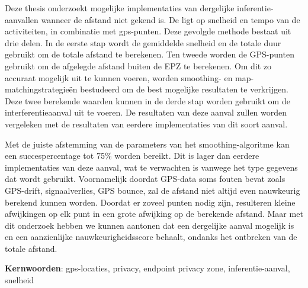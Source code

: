 Deze thesis onderzoekt mogelijke implementaties van dergelijke
inferentie-aanvallen wanneer de afstand niet gekend is. De ligt op snelheid en
tempo van de activiteiten, in combinatie met gps-punten. Deze gevolgde methode
bestaat uit drie delen. In de eerste stap wordt de gemiddelde snelheid en de
totale duur gebruikt om de totale afstand te berekenen. Ten tweede worden de
GPS-punten gebruikt om de afgelegde afstand buiten de EPZ te berekenen. Om dit
zo accuraat mogelijk uit te kunnen voeren, worden smoothing- en
map-matchingstrategieën bestudeerd om de best mogelijke resultaten te
verkrijgen. Deze twee berekende waarden kunnen in de derde stap worden gebruikt
om de interferentieaanval uit te voeren. De resultaten van deze aanval zullen
worden vergeleken met de resultaten van eerdere implementaties van dit soort
aanval.

Met de juiste afstemming van de parameters van het smoothing-algoritme kan een
succespercentage tot 75\% worden bereikt. Dit is lager dan eerdere
implementaties van deze aanval, wat te verwachten is vanwege het type gegevens
dat wordt gebruikt. Voornamelijk doordat GPS-data soms fouten bevat zoals
GPS-drift, signaalverlies, GPS bounce, zal de afstand niet altijd even
nauwkeurig berekend kunnen worden. Doordat er zoveel punten nodig zijn,
resulteren kleine afwijkingen op elk punt in een grote afwijking op de
berekende afstand. Maar met dit onderzoek hebben we kunnen aantonen dat een
dergelijke aanval mogelijk is en een aanzienlijke nauwkeurigheidsscore behaalt,
ondanks het ontbreken van de totale afstand.

\textbf{Kernwoorden}: gps-locaties, privacy, endpoint privacy zone,
inferentie-aanval, snelheid